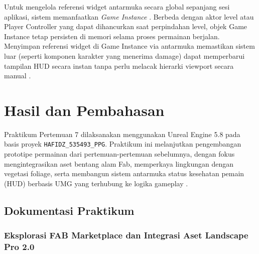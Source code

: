 \documentclass[a4paper,oneside,12pt]{report}
\newcommand{\tocboldsection}[1]{%
  \protect\renewcommand{\protect\cftchapfont}{\protect\bfseries}%
  #1%
  \protect\renewcommand{\protect\cftchapfont}{}%
}
\begin{document}
Untuk mengelola referensi widget antarmuka secara global sepanjang sesi aplikasi, sistem memanfaatkan \textit{Game Instance} \cite{epic-game-instance}. Berbeda dengan aktor level atau Player Controller yang dapat dihancurkan saat perpindahan level, objek Game Instance tetap persisten di memori selama proses permainan berjalan. Menyimpan referensi widget di Game Instance via antarmuka memastikan sistem luar (seperti komponen karakter yang menerima damage) dapat memperbarui tampilan HUD secara instan tanpa perlu melacak hierarki viewport secara manual \cite{modul7,epic-game-instance}.

\clearpage

\chapter[\tocboldsection{Hasil dan Pembahasan}]{Hasil dan Pembahasan}

Praktikum Pertemuan 7 dilaksanakan menggunakan Unreal Engine 5.8 pada basis proyek \texttt{HAFIDZ\_535493\_PPG}. Praktikum ini melanjutkan pengembangan prototipe permainan dari pertemuan-pertemuan sebelumnya, dengan fokus mengintegrasikan aset bentang alam Fab, memperkaya lingkungan dengan vegetasi foliage, serta membangun sistem antarmuka status kesehatan pemain (HUD) berbasis UMG yang terhubung ke logika gameplay \cite{modul7}.

\section{Dokumentasi Praktikum}

\subsection{Eksplorasi FAB Marketplace dan Integrasi Aset Landscape Pro 2.0}
\end{document}
